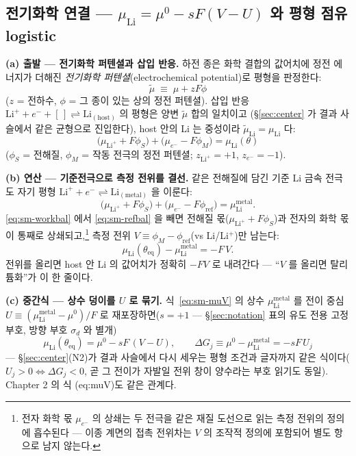\documentclass[11pt,a4paper]{article}
\newcommand{\eq}{\mathrm{eq}}
\begin{document}
\subsection{전기화학 연결 --- $\mu_\mathrm{Li}=\mu^0-sF(V-U)$ 와 평형 점유 logistic}\label{sec:sm-electro}
\textbf{(a) 출발 --- 전기화학 퍼텐셜과 삽입 반응.} 하전 종은 화학 결합의 값어치에 정전 에너지가 더해진
\emph{전기화학 퍼텐셜}(electrochemical potential)로 평형을 판정한다:
\begin{equation}
\tilde\mu\;\equiv\;\mu+zF\phi
\label{eq:sm-emu}
\end{equation}
($z$ = 전하수, $\phi$ = 그 종이 있는 상의 정전 퍼텐셜). 삽입 반응
$\mathrm{Li}^++e^-+[\,]\rightleftharpoons\mathrm{Li}_{(\mathrm{host})}$ 의 평형은 양변 $\tilde\mu$ 합의 일치이고
(\S\ref{sec:center} 가 결과 사슬에서 같은 균형으로 진입한다), host 안의 Li 는 중성이라
$\tilde\mu_\mathrm{Li}=\mu_\mathrm{Li}$ 다:
\begin{equation}
\big(\mu_{\mathrm{Li}^+}+F\phi_S\big)+\big(\mu_{e^-}-F\phi_M\big)=\mu_\mathrm{Li}(\theta)
\label{eq:sm-workbal}
\end{equation}
($\phi_S$ = 전해질, $\phi_M$ = 작동 전극의 정전 퍼텐셜; $z_{\mathrm{Li}^+}{=}+1$, $z_{e^-}{=}-1$).

\textbf{(b) 연산 --- 기준전극으로 측정 전위를 결선.} 같은 전해질에 담긴 기준 Li 금속 전극도 자기 평형
$\mathrm{Li}^++e^-\rightleftharpoons\mathrm{Li}_{(\mathrm{metal})}$ 을 이룬다:
\begin{equation}
\big(\mu_{\mathrm{Li}^+}+F\phi_S\big)+\big(\mu_{e^-}-F\phi_\mathrm{ref}\big)=\mu_\mathrm{Li}^\mathrm{metal}.
\label{eq:sm-refbal}
\end{equation}
\eqref{eq:sm-workbal} 에서 \eqref{eq:sm-refbal} 을 빼면 전해질 몫($\mu_{\mathrm{Li}^+}+F\phi_S$)과 전자의
화학 몫이 통째로 상쇄되고,\footnote{전자 화학 몫 $\mu_{e^-}$ 의 상쇄는 두 전극을 같은 재질 도선으로 읽는
측정 전위의 정의에 흡수된다 — 이종 계면의 접촉 전위차는 $V$ 의 조작적 정의에 포함되어 별도 항으로 남지 않는다.}
측정 전위 $V\equiv\phi_M-\phi_\mathrm{ref}$(vs Li/Li$^+$)만 남는다:
\begin{equation}
\mu_\mathrm{Li}(\theta_\eq)-\mu_\mathrm{Li}^\mathrm{metal}=-F\,V.
\label{eq:sm-muV}
\end{equation}
전위를 올리면 host 안 Li 의 값어치가 정확히 $-FV$ 로 내려간다 --- ``$V$ 를 올리면 탈리튬화''가 이 한 줄이다.

\textbf{(c) 중간식 --- 상수 덩이를 $U$ 로 묶기.} 식~\eqref{eq:sm-muV} 의 상수 $\mu_\mathrm{Li}^\mathrm{metal}$
를 전이 중심 $U\equiv(\mu_\mathrm{Li}^\mathrm{metal}-\mu^0)/F$ 로 재포장하면($s=+1$ --- \S\ref{sec:notation}
표의 유도 전용 고정 부호, 방향 부호 $\sigma_d$ 와 별개)
\begin{equation}
\mu_\mathrm{Li}(\theta_\eq)=\mu^0-sF\,(V-U),
\qquad
\Delta G_j\equiv\mu^0-\mu_\mathrm{Li}^\mathrm{metal}=-sF\,U_j
\label{eq:sm-eqcond}
\end{equation}
--- \S\ref{sec:center}(N2)가 결과 사슬에서 다시 세우는 평형 조건과 글자까지 같은 식이다($U_j>0
\Leftrightarrow\Delta G_j<0$, 곧 그 전이가 자발일 전위 창이 양수라는 부호 읽기도 동일). Chapter 2 의 식
(eq:muV)도 같은 관계다.
\end{document}
